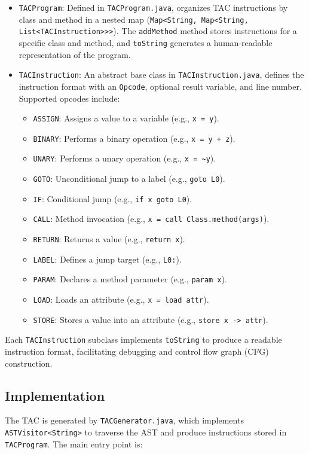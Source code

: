 \documentclass[11pt, titlepage]{article}
\begin{document}
\begin{itemize}[leftmargin=*]
    \item \texttt{TACProgram}: Defined in \texttt{TACProgram.java}, organizes TAC instructions by class and method in a nested map (\texttt{Map<String, Map<String, List<TACInstruction>>>}). The \texttt{addMethod} method stores instructions for a specific class and method, and \texttt{toString} generates a human-readable representation of the program.
    \item \texttt{TACInstruction}: An abstract base class in \texttt{TACInstruction.java}, defines the instruction format with an \texttt{Opcode}, optional result variable, and line number. Supported opcodes include:
        \begin{itemize}
            \item \texttt{ASSIGN}: Assigns a value to a variable (e.g., \texttt{x = y}).
            \item \texttt{BINARY}: Performs a binary operation (e.g., \texttt{x = y + z}).
            \item \texttt{UNARY}: Performs a unary operation (e.g., \texttt{x = \textasciitilde y}).
            \item \texttt{GOTO}: Unconditional jump to a label (e.g., \texttt{goto L0}).
            \item \texttt{IF}: Conditional jump (e.g., \texttt{if x goto L0}).
            \item \texttt{CALL}: Method invocation (e.g., \texttt{x = call Class.method(args)}).
            \item \texttt{RETURN}: Returns a value (e.g., \texttt{return x}).
            \item \texttt{LABEL}: Defines a jump target (e.g., \texttt{L0:}).
            \item \texttt{PARAM}: Declares a method parameter (e.g., \texttt{param x}).
            \item \texttt{LOAD}: Loads an attribute (e.g., \texttt{x = load attr}).
            \item \texttt{STORE}: Stores a value into an attribute (e.g., \texttt{store x -> attr}).
        \end{itemize}
\end{itemize}

Each \texttt{TACInstruction} subclass implements \texttt{toString} to produce a readable instruction format, facilitating debugging and control flow graph (CFG) construction.

\subsection{Implementation}
The TAC is generated by \texttt{TACGenerator.java}, which implements \texttt{ASTVisitor<String>} to traverse the AST and produce instructions stored in \texttt{TACProgram}. The main entry point is:
\end{document}
